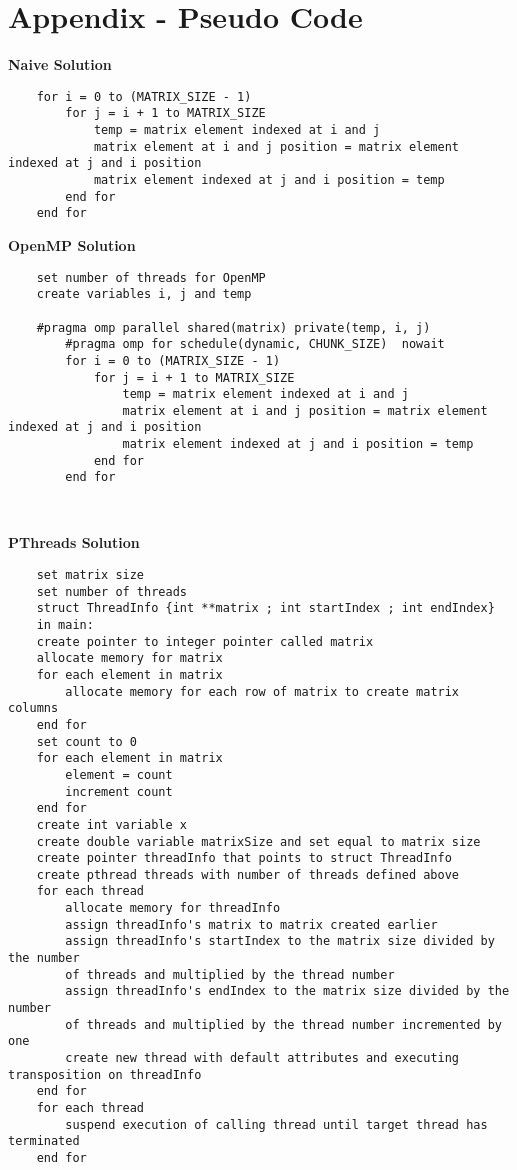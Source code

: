 \documentclass[10pt,onecolumn]{article}
\begin{document}
    \newpage
    \section*{Appendix - Pseudo Code}
    
    \textbf{Naive Solution}
    \begin{Verbatim}
    for i = 0 to (MATRIX_SIZE - 1)
        for j = i + 1 to MATRIX_SIZE
            temp = matrix element indexed at i and j 
            matrix element at i and j position = matrix element indexed at j and i position
            matrix element indexed at j and i position = temp
        end for
    end for
    \end{Verbatim}
    
    \textbf{OpenMP Solution}
    \begin{Verbatim}
    set number of threads for OpenMP
    create variables i, j and temp
    
    #pragma omp parallel shared(matrix) private(temp, i, j)
        #pragma omp for schedule(dynamic, CHUNK_SIZE)  nowait
        for i = 0 to (MATRIX_SIZE - 1)
            for j = i + 1 to MATRIX_SIZE
                temp = matrix element indexed at i and j 
                matrix element at i and j position = matrix element indexed at j and i position
                matrix element indexed at j and i position = temp
            end for
        end for    
        
    
    \end{Verbatim}
    \textbf{PThreads Solution}
    \begin{Verbatim}
    set matrix size
    set number of threads
    struct ThreadInfo {int **matrix ; int startIndex ; int endIndex}
    in main:
    create pointer to integer pointer called matrix
    allocate memory for matrix 
    for each element in matrix
        allocate memory for each row of matrix to create matrix columns
    end for
    set count to 0
    for each element in matrix
        element = count 
        increment count
    end for
    create int variable x
    create double variable matrixSize and set equal to matrix size
    create pointer threadInfo that points to struct ThreadInfo
    create pthread threads with number of threads defined above
    for each thread
        allocate memory for threadInfo
        assign threadInfo's matrix to matrix created earlier
        assign threadInfo's startIndex to the matrix size divided by the number
        of threads and multiplied by the thread number
        assign threadInfo's endIndex to the matrix size divided by the number 
        of threads and multiplied by the thread number incremented by one
        create new thread with default attributes and executing transposition on threadInfo
    end for
    for each thread 
        suspend execution of calling thread until target thread has terminated
    end for
    
    
    \end{Verbatim}
    
    
    
\end{document}
